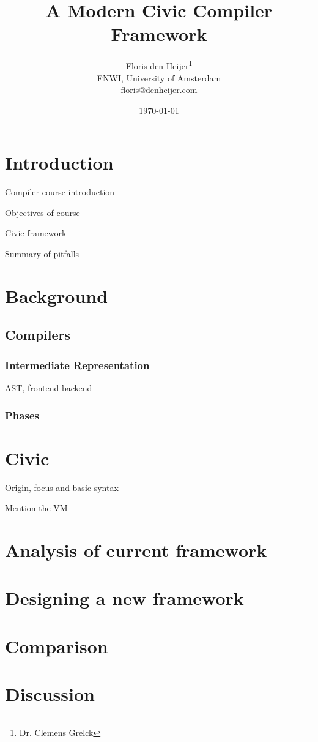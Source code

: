 \documentclass[final,a4paper,12pt]{article}
\author{Floris den Heijer\thanks{Dr. Clemens Grelck}\\
 FNWI, University of Amsterdam\\
 floris@denheijer.com}
\date{\today}
\title{A Modern Civic Compiler Framework}
\begin{document}
\maketitle
\clearpage

\tableofcontents
\clearpage

\section{Introduction}
Compiler course introduction

Objectives of course

Civic framework

Summary of pitfalls

\section{Background}
\subsection{Compilers}
\subsubsection{Intermediate Representation}
AST, frontend backend
\subsubsection{Phases}

\section{Civic}
Origin, focus and basic syntax

Mention the VM

\section{Analysis of current framework}

\section{Designing a new framework}

\section{Comparison}

\section{Discussion}
\end{document}
